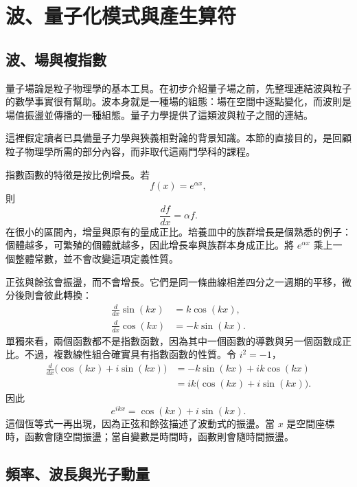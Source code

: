 \chapter{波、量子化模式與產生算符}

\section{波、場與複指數}

量子場論是粒子物理學的基本工具。在初步介紹量子場之前，先整理連結波與粒子的數學事實很有幫助。波本身就是一種場的組態：場在空間中逐點變化，而波則是場值振盪並傳播的一種組態。量子力學提供了這類波與粒子之間的連結。

這裡假定讀者已具備量子力學與狹義相對論的背景知識。本節的直接目的，是回顧粒子物理學所需的部分內容，而非取代這兩門學科的課程。

指數函數的特徵是按比例增長。若
\begin{equation}
f(x)=e^{\alpha x},
\end{equation}
則
\begin{equation}
\frac{df}{dx}=\alpha f.
\end{equation}
在很小的區間內，增量與原有的量成正比。培養皿中的族群增長是個熟悉的例子：個體越多，可繁殖的個體就越多，因此增長率與族群本身成正比。將 \(e^{\alpha x}\) 乘上一個整體常數，並不會改變這項定義性質。

正弦與餘弦會振盪，而不會增長。它們是同一條曲線相差四分之一週期的平移，微分後則會彼此轉換：
\begin{align}
\frac{d}{dx}\sin(kx)&=k\cos(kx),\\
\frac{d}{dx}\cos(kx)&=-k\sin(kx).
\end{align}
單獨來看，兩個函數都不是指數函數，因為其中一個函數的導數與另一個函數成正比。不過，複數線性組合確實具有指數函數的性質。令 \(i^2=-1\)，
\begin{align}
\frac{d}{dx}\bigl(\cos(kx)+i\sin(kx)\bigr)
&=-k\sin(kx)+ik\cos(kx)\\
&=ik\bigl(\cos(kx)+i\sin(kx)\bigr).
\end{align}
因此
\begin{equation}
e^{ikx}=\cos(kx)+i\sin(kx).
\end{equation}
這個恆等式一再出現，因為正弦和餘弦描述了波動式的振盪。當 \(x\) 是空間座標時，函數會隨空間振盪；當自變數是時間時，函數則會隨時間振盪。

\section{頻率、波長與光子動量}

